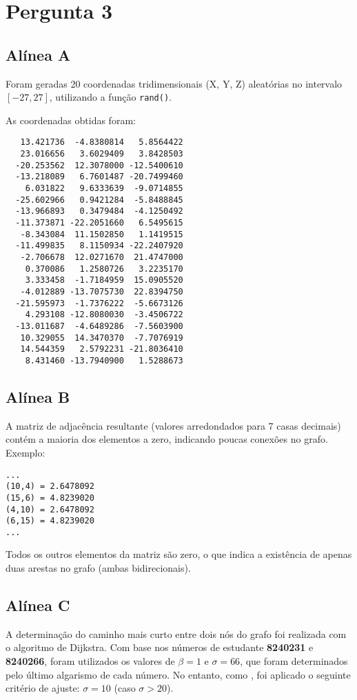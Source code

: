 \chapter{Pergunta 3}
\section*{Alínea A}

Foram geradas 20 coordenadas tridimensionais (X, Y, Z) aleatórias no intervalo \([-27, 27]\), utilizando a função \texttt{rand()}.

As coordenadas obtidas foram:

\begin{verbatim}
   13.421736  -4.8380814   5.8564422
   23.016656   3.6029409   3.8428503
  -20.253562  12.3078000 -12.5400610
  -13.218089   6.7601487 -20.7499460
    6.031822   9.6333639  -9.0714855
  -25.602966   0.9421284  -5.8488845
  -13.966893   0.3479484  -4.1250492
  -11.373871 -22.2051660   6.5495615
   -8.343084  11.1502850   1.1419515
  -11.499835   8.1150934 -22.2407920
   -2.706678  12.0271670  21.4747000
    0.370086   1.2580726   3.2235170
    3.333458  -1.7184959  15.0905520
   -4.012889 -13.7075730  22.8394750
  -21.595973  -1.7376222  -5.6673126
    4.293108 -12.8080030  -3.4506722
  -13.011687  -4.6489286  -7.5603900
   10.329055  14.3470370  -7.7076919
   14.544359   2.5792231 -21.8036410
    8.431460 -13.7940900   1.5288673
\end{verbatim}

\section*{Alínea B}

A matriz de adjacência resultante (valores arredondados para 7 casas decimais) contém a maioria dos elementos a zero, indicando poucas conexões no grafo. Exemplo:

\begin{verbatim}
... 
(10,4) = 2.6478092
(15,6) = 4.8239020
(4,10) = 2.6478092
(6,15) = 4.8239020
...
\end{verbatim}

Todos os outros elementos da matriz são zero, o que indica a existência de apenas duas arestas no grafo (ambas bidirecionais).

\section*{Alínea C}
A determinação do caminho mais curto entre dois nós do grafo foi realizada com o algoritmo de Dijkstra. Com base nos números de estudante \textbf{8240231} e \textbf{8240266}, foram utilizados os valores de \(\beta = 1\) e \(\sigma = 66\), que foram determinados pelo último algarismo de cada número.
No entanto, como , foi aplicado o seguinte critério de ajuste:
\newline
\(\sigma = 10\) (caso \(\sigma > 20\)).

